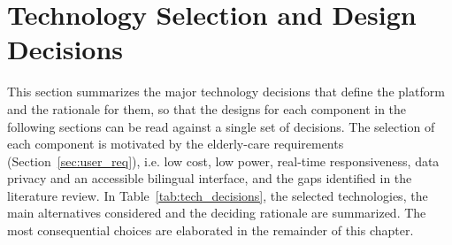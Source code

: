 \section{Technology Selection and Design Decisions}
\label{sec:tech_selection}

This section summarizes the major technology decisions that define the platform and the rationale for them, so that the designs for each component in the following sections can be read against a single set of decisions. The selection of each component is motivated by the elderly-care requirements (Section~\ref{sec:user_req}), i.e. low cost, low power, real-time responsiveness, data privacy and an accessible bilingual interface, and the gaps identified in the literature review. In Table~\ref{tab:tech_decisions}, the selected technologies, the main alternatives considered and the deciding rationale are summarized. The most consequential choices are elaborated in the remainder of this chapter.

